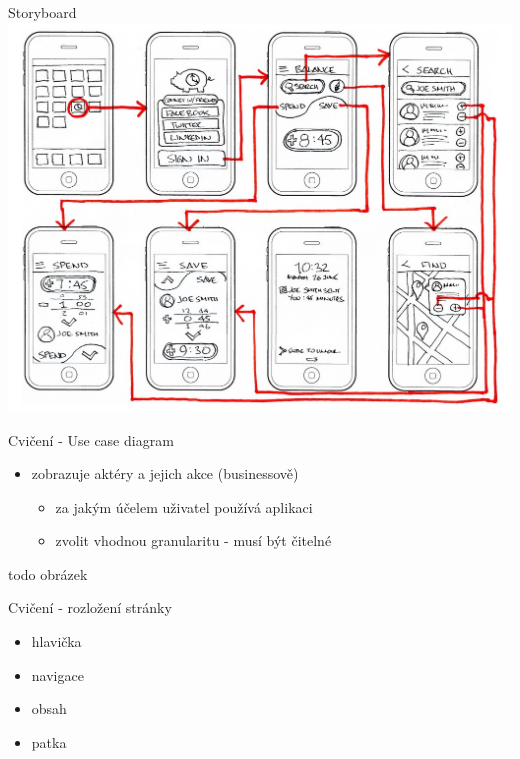 \documentclass{beamer}
\begin{document}
\begin{frame}{Storyboard}
	  \includegraphics[width=\columnwidth]{storyboard-map}
\end{frame}


\begin{frame}{Cvičení - Use case diagram}
	\begin{itemize}
		\item zobrazuje aktéry a jejich akce (businessově)
		\begin{itemize}
			\item za jakým účelem uživatel používá aplikaci
			\item zvolit vhodnou granularitu - musí být čitelné
		\end{itemize}  
	\end{itemize}
	
	todo obrázek
	
\end{frame}


\begin{frame}{Cvičení - rozložení stránky}
	\begin{itemize}
		\item hlavička
		\item navigace
		\item obsah
		\item patka 
	\end{itemize}
\end{frame}
\end{document}
